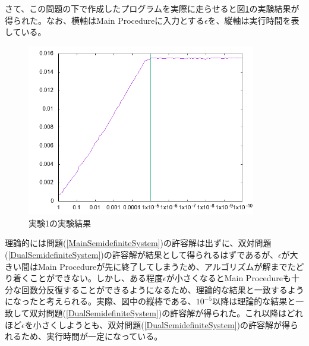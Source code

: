 さて、この問題の下で作成したプログラムを実際に走らせると図\ref{test1}の実験結果が得られた。なお、横軸はMain Procedureに入力とする$\epsilon$を、縦軸は実行時間を表している。
\begin{figure}
  \centering
  \includegraphics[width=10cm]{test1.png}
  \caption{実験1の実験結果}
  \label{test1}
\end{figure}

理論的には問題(\ref{MainSemidefiniteSystem})の許容解は出ずに、双対問題(\ref{DualSemidefiniteSystem})の許容解が結果として得られるはずであるが、$\epsilon$が大きい間はMain Procedureが先に終了してしまうため、アルゴリズムが解までたどり着くことができない。しかし、ある程度$\epsilon$が小さくなるとMain Procedureも十分な回数分反復することができるようになるため、理論的な結果と一致するようになったと考えられる。実際、図中の縦棒である、$10^{-5}$以降は理論的な結果と一致して双対問題(\ref{DualSemidefiniteSystem})の許容解が得られた。これ以降はどれほど$\epsilon$を小さくしようとも、双対問題(\ref{DualSemidefiniteSystem})の許容解が得られるため、実行時間が一定になっている。

